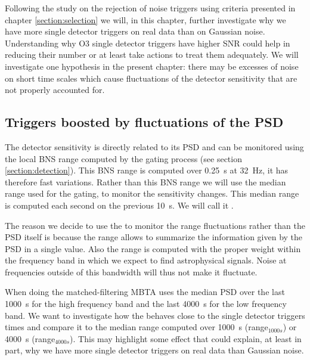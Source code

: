 Following the study on the rejection of noise triggers using criteria presented in chapter \ref{section:selection} we will, in this chapter, further investigate why we have more single detector triggers on real data than on Gaussian noise.
Understanding why O3 single detector triggers have higher SNR could help in reducing their number or at least take actions to treat them adequately.
We will investigate one hypothesis in the present chapter: there may be excesses of noise on short time scales which cause fluctuations of the detector sensitivity that are not properly accounted for.


\subsection{Triggers boosted by fluctuations of the PSD}
\label{sec:triggers_PSD}

The detector sensitivity is directly related to its PSD and can be monitored using the local BNS range computed by the gating process (see section \ref{section:detection}).
This BNS range is computed over \SI{0.25}{s} at \SI{32}{Hz}, it has therefore fast variations.
Rather than this BNS range we will use the median range used for the gating, to monitor the sensitivity changes.
This median range is computed each second on the previous \SI{10}{s}.
We will call it \medr{}.

The reason we decide to use the to monitor the range fluctuations rather than the PSD itself is because the range allows to summarize the information given by the PSD in a single value.
Also the range is computed with the proper weight within the frequency band in which we expect to find astrophysical signals.
Noise at frequencies outside of this bandwidth will thus not make it fluctuate.

When doing the matched-filtering MBTA uses the median PSD over the last \SI{1000}{s} for the high frequency band and the last \SI{4000}{s} for the low frequency band.
We want to investigate how the \medr{} behaves close to the single detector triggers times and compare it to the median range computed over \SI{1000}{s} (range$_{1000s}$) or \SI{4000}{s} (range$_{4000s}$).
This may highlight some effect that could explain, at least in part, why we have more single detector triggers on real data than Gaussian noise.

